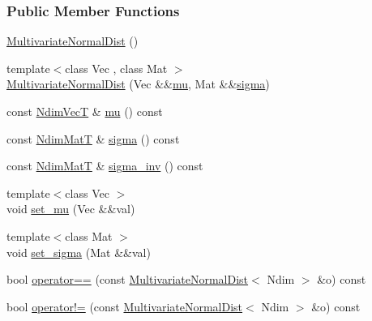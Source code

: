 \subsubsection*{Public Member Functions}
\begin{DoxyCompactItemize}
\item 
\hyperlink{classprior__hessian_1_1MultivariateNormalDist_a9347495e045f105c79a13db3422c6391}{Multivariate\+Normal\+Dist} ()
\item 
{\footnotesize template$<$class Vec , class Mat $>$ }\\\hyperlink{classprior__hessian_1_1MultivariateNormalDist_ab97d0301af152e72c9e6f6d3672d30e0}{Multivariate\+Normal\+Dist} (Vec \&\&\hyperlink{classprior__hessian_1_1MultivariateNormalDist_a53e894d82ca08f285fc004b77301495d}{mu}, Mat \&\&\hyperlink{classprior__hessian_1_1MultivariateNormalDist_aa4e86dd2b8e088553aac8c6b0fa50832}{sigma})
\item 
const \hyperlink{classprior__hessian_1_1MultivariateNormalDist_a0f5725cbbfa47be45b2741467dcd5615}{Ndim\+VecT} \& \hyperlink{classprior__hessian_1_1MultivariateNormalDist_a53e894d82ca08f285fc004b77301495d}{mu} () const 
\item 
const \hyperlink{classprior__hessian_1_1MultivariateNormalDist_a2aa1e12ff8819a2cc3a8d3f33bcf8de2}{Ndim\+MatT} \& \hyperlink{classprior__hessian_1_1MultivariateNormalDist_aa4e86dd2b8e088553aac8c6b0fa50832}{sigma} () const 
\item 
const \hyperlink{classprior__hessian_1_1MultivariateNormalDist_a2aa1e12ff8819a2cc3a8d3f33bcf8de2}{Ndim\+MatT} \& \hyperlink{classprior__hessian_1_1MultivariateNormalDist_a38fa22fd87e3603397c433e33ce0c2be}{sigma\+\_\+inv} () const 
\item 
{\footnotesize template$<$class Vec $>$ }\\void \hyperlink{classprior__hessian_1_1MultivariateNormalDist_a3a232f67a79457c91ce1c061a19d18bc}{set\+\_\+mu} (Vec \&\&val)
\item 
{\footnotesize template$<$class Mat $>$ }\\void \hyperlink{classprior__hessian_1_1MultivariateNormalDist_aecd463f33fd68330ae245c2ad05e7b2f}{set\+\_\+sigma} (Mat \&\&val)
\item 
bool \hyperlink{classprior__hessian_1_1MultivariateNormalDist_a50243ac0981ffdd3e6bb3566e8b3afc0}{operator==} (const \hyperlink{classprior__hessian_1_1MultivariateNormalDist}{Multivariate\+Normal\+Dist}$<$ Ndim $>$ \&o) const 
\item 
bool \hyperlink{classprior__hessian_1_1MultivariateNormalDist_a5bdf1c751f8da8a9043542ed080bb230}{operator!=} (const \hyperlink{classprior__hessian_1_1MultivariateNormalDist}{Multivariate\+Normal\+Dist}$<$ Ndim $>$ \&o) const 

\end{DoxyCompactItemize}
